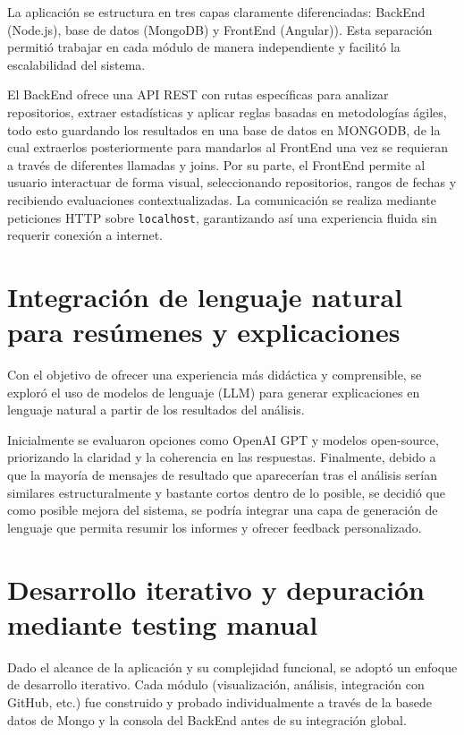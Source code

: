 La aplicación se estructura en tres capas claramente diferenciadas: BackEnd (Node.js), base de datos (MongoDB) y FrontEnd (Angular)). Esta separación permitió trabajar en cada módulo de manera independiente y facilitó la escalabilidad del sistema.

El BackEnd ofrece una API REST con rutas específicas para analizar repositorios, extraer estadísticas y aplicar reglas basadas en metodologías ágiles, todo esto guardando los resultados en una base de datos en MONGODB, de la cual extraerlos posteriormente para mandarlos al FrontEnd una vez se requieran a través de diferentes llamadas y joins. Por su parte, el FrontEnd permite al usuario interactuar de forma visual, seleccionando repositorios, rangos de fechas y recibiendo evaluaciones contextualizadas. La comunicación se realiza mediante peticiones HTTP sobre \texttt{localhost}, garantizando así una experiencia fluida sin requerir conexión a internet.

\section{Integración de lenguaje natural para resúmenes y explicaciones}

Con el objetivo de ofrecer una experiencia más didáctica y comprensible, se exploró el uso de modelos de lenguaje (LLM) para generar explicaciones en lenguaje natural a partir de los resultados del análisis. 

Inicialmente se evaluaron opciones como OpenAI GPT y modelos open-source, priorizando la claridad y la coherencia en las respuestas. Finalmente, debido a que la mayoría de mensajes de resultado que aparecerían tras el análisis serían similares estructuralmente y bastante cortos dentro de lo posible, se decidió que como posible mejora del sistema, se podría integrar una capa de generación de lenguaje que permita resumir los informes y ofrecer feedback personalizado.

\section{Desarrollo iterativo y depuración mediante testing manual}

Dado el alcance de la aplicación y su complejidad funcional, se adoptó un enfoque de desarrollo iterativo. Cada módulo (visualización, análisis, integración con GitHub, etc.) fue construido y probado individualmente a través de la basede datos de Mongo y la consola del BackEnd antes de su integración global.

